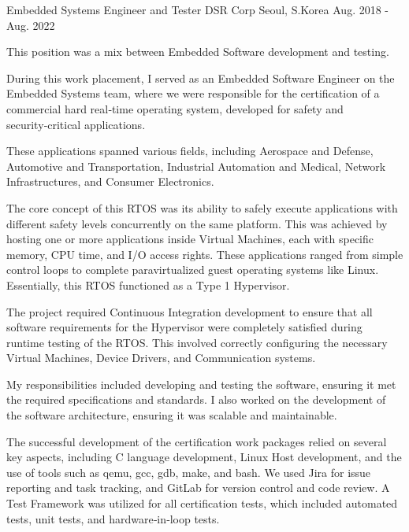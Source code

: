 \begin{cventries}
  \cventry
    {Embedded Systems Engineer and Tester} %
    {DSR Corp} %
    {Seoul, S.Korea} %
    {Aug. 2018 - Aug. 2022} %
    {
      \begin{cvitems} %
        \item {This position was a mix between Embedded Software development and testing.}
        \item {During this work placement, I served as an Embedded Software Engineer on the Embedded Systems team, where we were responsible for the certification of a commercial hard real‑time operating system, developed for safety and security‑critical applications.}
        \item {These applications spanned various fields, including Aerospace and Defense, Automotive and Transportation, Industrial Automation and Medical, Network Infrastructures, and Consumer Electronics.}
        \item {The core concept of this RTOS was its ability to safely execute applications with different safety levels concurrently on the same platform. This was achieved by hosting one or more applications inside Virtual Machines, each with specific memory, CPU time, and I/O access rights. These applications ranged from simple control loops to complete paravirtualized guest operating systems like Linux. Essentially, this RTOS functioned as a Type 1 Hypervisor.}
        \item {The project required Continuous Integration development to ensure that all software requirements for the Hypervisor were completely satisfied during runtime testing of the RTOS. This involved correctly configuring the necessary Virtual Machines, Device Drivers, and Communication systems.}
        \item {My responsibilities included developing and testing the software, ensuring it met the required specifications and standards. I also worked on the development of the software architecture, ensuring it was scalable and maintainable.}
        \item {The successful development of the certification work packages relied on several key aspects, including C language development, Linux Host development, and the use of tools such as qemu, gcc, gdb, make, and bash. We used Jira for issue reporting and task tracking, and GitLab for version control and code review. A Test Framework was utilized for all certification tests, which included automated tests, unit tests, and hardware‑in‑loop tests.}

\end{cvitems}}
\end{cventries}
